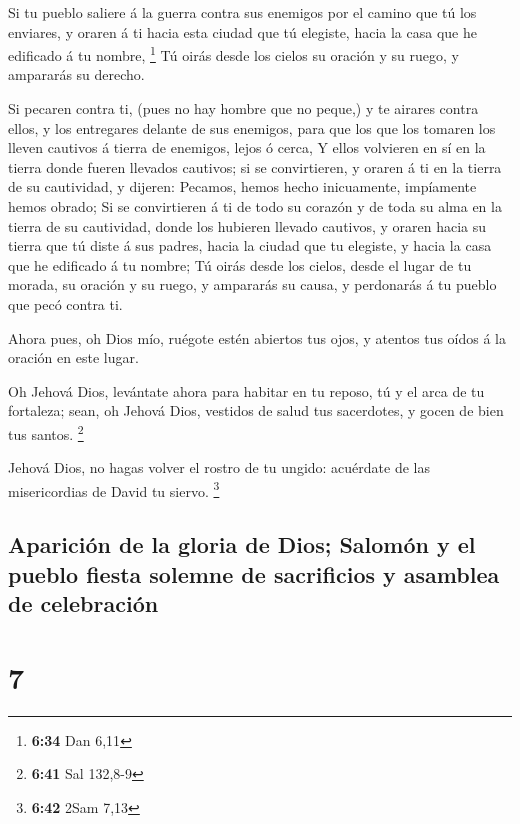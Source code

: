  Si tu pueblo saliere á la guerra contra sus enemigos por
el camino que tú los enviares, y oraren á ti hacia esta ciudad que tú
elegiste, hacia la casa que he edificado á tu nombre, \footnote{\textbf{6:34}
  Dan 6,11}  Tú oirás desde los cielos su oración y su
ruego, y ampararás su derecho.

 Si pecaren contra ti, (pues no hay hombre que no peque,)
y te airares contra ellos, y los entregares delante de sus enemigos,
para que los que los tomaren los lleven cautivos á tierra de enemigos,
lejos ó cerca,  Y ellos volvieren en sí en la tierra
donde fueren llevados cautivos; si se convirtieren, y oraren á ti en la
tierra de su cautividad, y dijeren: Pecamos, hemos hecho inicuamente,
impíamente hemos obrado;  Si se convirtieren á ti de todo
su corazón y de toda su alma en la tierra de su cautividad, donde los
hubieren llevado cautivos, y oraren hacia su tierra que tú diste á sus
padres, hacia la ciudad que tu elegiste, y hacia la casa que he
edificado á tu nombre;  Tú oirás desde los cielos, desde
el lugar de tu morada, su oración y su ruego, y ampararás su causa, y
perdonarás á tu pueblo que pecó contra ti.

 Ahora pues, oh Dios mío, ruégote estén abiertos tus
ojos, y atentos tus oídos á la oración en este lugar.

 Oh Jehová Dios, levántate ahora para habitar en tu
reposo, tú y el arca de tu fortaleza; sean, oh Jehová Dios, vestidos de
salud tus sacerdotes, y gocen de bien tus santos. \footnote{\textbf{6:41}
  Sal 132,8-9}

 Jehová Dios, no hagas volver el rostro de tu ungido:
acuérdate de las misericordias de David tu siervo. \footnote{\textbf{6:42}
  2Sam 7,13}

\hypertarget{apariciuxf3n-de-la-gloria-de-dios-salomuxf3n-y-el-pueblo-fiesta-solemne-de-sacrificios-y-asamblea-de-celebraciuxf3n}{%
\subsection{Aparición de la gloria de Dios; Salomón y el pueblo fiesta
solemne de sacrificios y asamblea de
celebración}\label{apariciuxf3n-de-la-gloria-de-dios-salomuxf3n-y-el-pueblo-fiesta-solemne-de-sacrificios-y-asamblea-de-celebraciuxf3n}}

\hypertarget{section-6}{%
\section{7}\label{section-6}}

